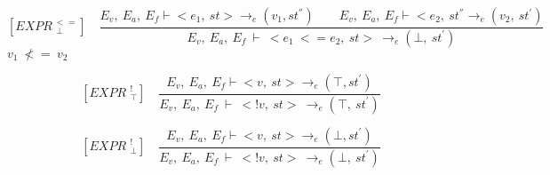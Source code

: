    	\[
   	[EXPR^{\ <=}_{\ \ \bot}] \quad
   	\dfrac{E_v, \ E_a, \ E_f \vdash <e_1, \ st> \rightarrow_e (v_1, st^{''}) \qquad E_v, \ E_a, \ E_f \vdash <e_2, \ st^{''} \rightarrow_e (v_2, \ st^{'})}{E_v, \ E_a, \ E_f \ \vdash \ <e_1 \ <= e_2, \ st> \ \rightarrow_e (\bot, \ st^{'})}
   	\]
	\begin{math}
   	v_1 \ \not<= \ v_2
   	\end{math}
   	
   	\[
   	[EXPR^{\ \ !}_{\ \ \top}] \quad
   	\dfrac{E_v, \ E_a, \ E_f \vdash <v, \ st> \rightarrow_e (\top, st^{'})}{E_v, \ E_a, \ E_f \ \vdash \ <!v, \ st> \ \rightarrow_e (\top, \ st^{'})}
   	\]  	  	

   	\[
   	[EXPR^{\ \ !}_{\ \ \bot}] \quad
   	\dfrac{E_v, \ E_a, \ E_f \vdash <v, \ st> \rightarrow_e (\bot, st^{'})}{E_v, \ E_a, \ E_f \ \vdash \ <!v, \ st> \ \rightarrow_e (\bot, \ st^{'})}
   	\]
   	